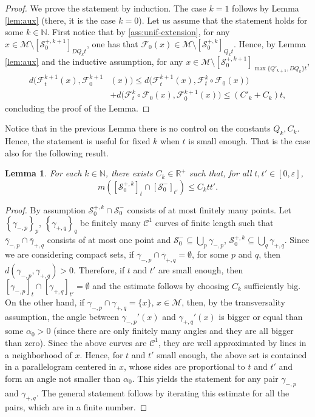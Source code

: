 \documentclass{amsart}
\numberwithin{equation}{section}
\newtheorem{lemma}[theorem]{Lemma}
\newcommand\ve{\varepsilon}
\renewcommand{\le}{\leqslant}
\newcommand\cC{{\mathcal C}}
\newcommand\cF{{\mathcal F}}
\newcommand\cM{{\mathcal M}}
\newcommand\cS{{\mathcal S}}
\newcommand\bN{{\mathbb N}}
\newcommand\bR{{\mathbb R}}
\begin{document}
\begin{proof}
We prove the statement by induction. The case \(k = 1\) follows by Lemma \ref{lem:aux} (there, it is the case \(k = 0\)). Let us assume that the statement holds for some \(k \in \bN\). First notice that by \ref{ass:unif-extension}, for any \(x \in \cM \setminus [\cS_0^{+,k+1}]_{ DQ_k t}\), one has that \(\cF_0(x) \in \cM \setminus [\cS_0^{+,k}]_{Q_k t}\). Hence, by Lemma \ref{lem:aux} and the inductive assumption, for any \(x \in \cM \setminus [\cS_0^{+,k+1}]_{\max\{Q'_{k+1}, DQ_k \}t}\),
\[
\begin{split}
    d \bigl(\cF_t^{k+1}(x), \cF_0^{k+1}&(x)\bigr) \le d\bigl(\cF_t^{k+1}(x), \cF_t^k \circ \cF_0(x)\bigr)\\
& + d\bigl(\cF_t^k\circ\cF_0(x), \cF_0^{k+1}(x)\bigr) \le (C'_k + C_k)t,
\end{split}
\]
concluding the proof of the Lemma.
\end{proof}
Notice that in the previous Lemma there is no control on the constants \(Q_k, C_k\). Hence, the statement is useful for fixed \(k\) when \(t\) is small enough. That is the case also for the following result.
\begin{lemma}
  \label{lem:trasversality}
For each \(k \in \bN\), there exists \(C_k\in \bR^+\) such that, for all \(t, t' \in [0,\ve]\),
\[
    m\left([\cS^{+,k}_0 ]_{t} \cap [\cS_0^{-}]_{t'}\right) \le C_k t t'.
\]
\end{lemma}
\begin{proof}
By assumption \(\cS_{0}^{+,k}  \cap \cS_0^-\) consists of at most finitely many points. Let \(\left\{\gamma_{-, p}\right\}_p\), \(\left\{\gamma_{+,q}\right\}_q\) be finitely many \(\cC^1\) curves of finite length such that \(\overline \gamma_{-,p} \cap \overline \gamma_{+,q}\) consists of at most one point and \(\cS_0^- \subseteq \bigcup_{p}\gamma_{-,p}\), \(\cS_0^{+,k}  \subseteq \bigcup_{q} \gamma_{+,q}\). Since we are considering compact sets, if \(\overline\gamma_{-,p} \cap \overline\gamma_{+,q} = \emptyset\), for some \(p\) and \(q\), then \(d(\gamma_{-,p}, \gamma_{+,q})>0\). Therefore, if \(t\) and \(t'\) are small enough, then \( [\gamma_{-,p}]_t \cap [\gamma_{+,q}]_{t'} = \emptyset\) and the estimate follows by choosing \(C_k\) sufficiently big. On the other hand, if \(\gamma_{-,p} \cap \gamma_{+,q} = \{x\}\), \(x \in \cM\), then, by the transversality assumption, the angle between \(\gamma_{-,p}'(x)\) and \(\gamma_{+,q}'(x)\) is bigger or equal than some \(\alpha_0 >0\) (since there are only finitely many angles and they are all bigger than zero). Since the above curves are \(\cC^1\), they are well approximated by lines in a neighborhood of \(x\). Hence,  for \(t\) and \(t'\) small enough, the above set is contained in a parallelogram centered in \(x\), whose sides are proportional to \(t\) and \(t'\) and form an angle not smaller than \(\alpha_{0}\). This yields the statement for any pair \(\gamma_{-,p}\) and \(\gamma_{+,q}\). The general statement follows by iterating this estimate for all the pairs, which are in a finite number.
\end{proof}
\end{document}
